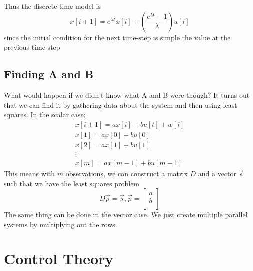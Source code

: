 \documentclass{article}
\begin{document}
Thus the discrete time model is
$$x[i+1]=e^{\lambda \delta}x[i]+\left(
    \frac{e^{\lambda t}-1}{\lambda}\right) u[i]$$
since the initial condition for the next time-step is simple the value at the previous time-step

\subsection{Finding A and B}
What would happen if we didn't know what A and B were though? It turns out that we can find it by gathering data about the system and then using least squares.
In the scalar case:
\[
    \begin{array}{c}
        x[i+1]=ax[i]+bu[t]+w[i]\\
        x[1]=ax[0]+bu[0]\\
        x[2]=ax[1]+bu[1]\\
        \vdots\\
        x[m]=ax[m-1]+bu[m-1]
    \end{array}
\]
This means with $m$ observations, we can construct a matrix $D$ and a vector $\vec{s}$ such that we have the least squares problem
\[
    D\vec{p}=\vec{s}, \vec{p}=
\left[
    \begin{array}{c}
        a\\
        b\\
    \end{array}
\right]
\]
The same thing can be done in the vector case. We just create multiple parallel systems by multiplying out the rows.
\section{Control Theory}
\end{document}
